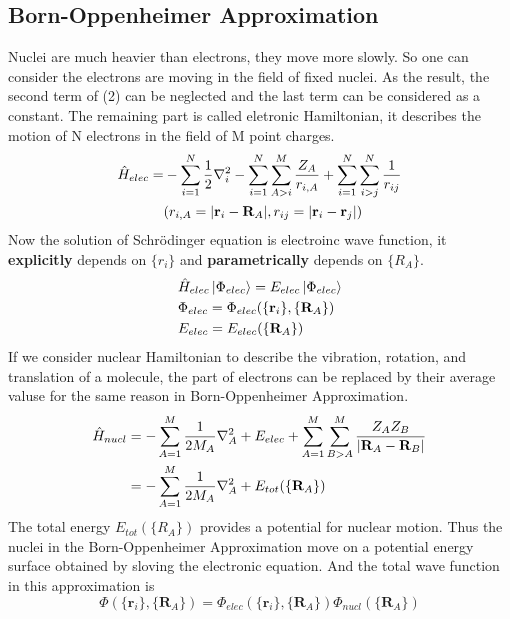 \documentclass[11pt]{article}
\begin{document}
\subsection{Born-Oppenheimer Approximation}
Nuclei are much heavier than electrons, they move more slowly. So one can consider the electrons
are moving in the field of fixed nuclei. As the result, the second term of (2) can be neglected
and the last term can be considered as a constant. The remaining part is called eletronic 
Hamiltonian, it describes the motion of N electrons in the field of M point charges.
\begin{equation}
    \begin{split}
        \Hat{H}_{elec}=&-\sum_{i=1}^{N}\frac{1}{2}\nabla_i^2-\sum_{i=1}^{N}\sum_{A>i}^{M}
        \frac{Z_A}{r_{i,A}}+\sum_{i=1}^{N}\sum_{i>j}^{N}\frac{1}{r_{ij}}\\
        &(r_{i,A}=|\mathbf{r}_i-\mathbf{R}_A|, r_{ij}=|\mathbf{r}_i-\mathbf{r}_j|)    
    \end{split}
\end{equation}
Now the solution of Schr\"odinger equation is electroinc wave function, it \textbf{explicitly} 
depends on $\{r_i\}$ and \textbf{parametrically} depends on $\{R_A\}$.  
\begin{align}
        &\Hat{H}_{elec}\ket{\Phi_{elec}}=E_{elec}\ket{\Phi_{elec}}\\
        &\Phi_{elec}=\Phi_{elec}(\{\mathbf{r}_i\},\{\mathbf{R}_A\})\\
        &E_{elec}=E_{elec}(\{\mathbf{R}_A\})
\end{align}
If we consider nuclear Hamiltonian to describe the vibration, rotation, and translation of a molecule, 
the part of electrons can be replaced by their average valuse for the same
reason in Born-Oppenheimer Approximation.
\begin{align}
    \Hat{H}_{nucl}&=-\sum_{A=1}^{M}\frac{1}{2M_A}\nabla_{A}^{2}+E_{elec}+\sum_{A=1}^{M}\sum_{B>A}^{M}\frac{Z_{A}Z_{B}}{|\mathbf{R}_A-\mathbf{R}_B|} \notag \\
    &=-\sum_{A=1}^{M}\frac{1}{2M_A}\nabla_{A}^{2}+E_{tot}(\{\mathbf{R}_A\})
\end{align}
The total energy $E_{tot}(\{R_A\})$ provides a potential for nuclear motion. Thus the nuclei in the Born-Oppenheimer Approximation
move on a potential energy surface obtained by sloving the electronic equation. And the total wave function in this approximation
is
\begin{equation}
    \Phi(\{\mathbf{r}_i\},\{\mathbf{R}_A\})=\Phi_{elec}(\{\mathbf{r}_i\},\{\mathbf{R}_A\})\Phi_{nucl}(\{\mathbf{R}_A\})
\end{equation}
\end{document}
